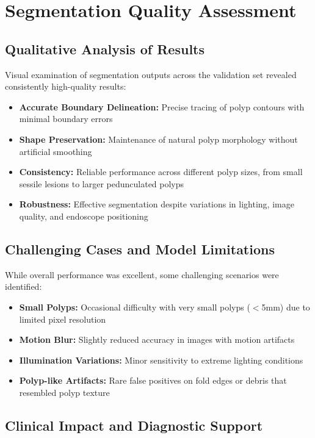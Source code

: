 \documentclass[a4paper,12pt]{report}
\begin{document}
\section{Segmentation Quality Assessment}

\subsection{Qualitative Analysis of Results}

Visual examination of segmentation outputs across the validation set revealed consistently high-quality results:

\begin{itemize}
    \item \textbf{Accurate Boundary Delineation:} Precise tracing of polyp contours with minimal boundary errors
    \item \textbf{Shape Preservation:} Maintenance of natural polyp morphology without artificial smoothing
    \item \textbf{Consistency:} Reliable performance across different polyp sizes, from small sessile lesions to larger pedunculated polyps
    \item \textbf{Robustness:} Effective segmentation despite variations in lighting, image quality, and endoscope positioning
\end{itemize}

\subsection{Challenging Cases and Model Limitations}

While overall performance was excellent, some challenging scenarios were identified:

\begin{itemize}
    \item \textbf{Small Polyps:} Occasional difficulty with very small polyps ($<$5mm) due to limited pixel resolution
    \item \textbf{Motion Blur:} Slightly reduced accuracy in images with motion artifacts
    \item \textbf{Illumination Variations:} Minor sensitivity to extreme lighting conditions
    \item \textbf{Polyp-like Artifacts:} Rare false positives on fold edges or debris that resembled polyp texture
\end{itemize}

\subsection{Clinical Impact and Diagnostic Support}
\end{document}
